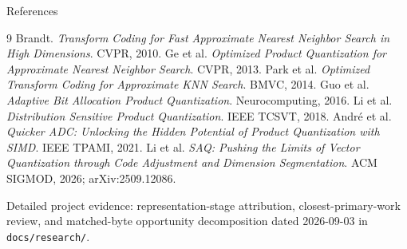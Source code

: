 \documentclass[aspectratio=169]{beamer}
\begin{document}
\begin{frame}{References}
\scriptsize
\begin{thebibliography}{9}
 Brandt. \emph{Transform Coding for Fast Approximate Nearest
Neighbor Search in High Dimensions}. CVPR, 2010.
 Ge et al. \emph{Optimized Product Quantization for Approximate
Nearest Neighbor Search}. CVPR, 2013.
 Park et al. \emph{Optimized Transform Coding for Approximate
KNN Search}. BMVC, 2014.
 Guo et al. \emph{Adaptive Bit Allocation Product
Quantization}. Neurocomputing, 2016.
 Li et al. \emph{Distribution Sensitive Product Quantization}.
IEEE TCSVT, 2018.
 Andr\'e et al. \emph{Quicker ADC: Unlocking the Hidden
Potential of Product Quantization with SIMD}. IEEE TPAMI, 2021.
 Li et al. \emph{SAQ: Pushing the Limits of Vector Quantization
through Code Adjustment and Dimension Segmentation}. ACM SIGMOD, 2026;
arXiv:2509.12086.
\end{thebibliography}
\vfill
\tiny Detailed project evidence: representation-stage attribution,
closest-primary-work review, and matched-byte opportunity decomposition dated
2026-09-03 in \texttt{docs/research/}.
\end{frame}
\end{document}
